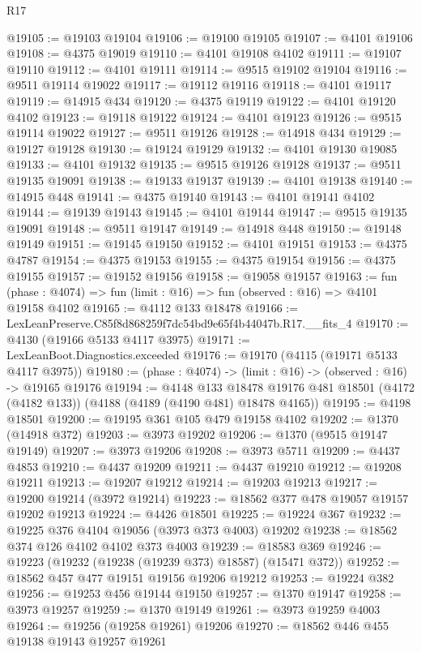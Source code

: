 \begin{lexlean}{R17}
\begin{coremodule}
@19105 := @19103 @19104
@19106 := @19100 @19105
@19107 := @4101 @19106
@19108 := @4375 @19019
@19110 := @4101 @19108 @4102
@19111 := @19107 @19110
@19112 := @4101 @19111
@19114 := @9515 @19102 @19104
@19116 := @9511 @19114 @19022
@19117 := @19112 @19116
@19118 := @4101 @19117
@19119 := @14915 @434
@19120 := @4375 @19119
@19122 := @4101 @19120 @4102
@19123 := @19118 @19122
@19124 := @4101 @19123
@19126 := @9515 @19114 @19022
@19127 := @9511 @19126
@19128 := @14918 @434
@19129 := @19127 @19128
@19130 := @19124 @19129
@19132 := @4101 @19130 @19085
@19133 := @4101 @19132
@19135 := @9515 @19126 @19128
@19137 := @9511 @19135 @19091
@19138 := @19133 @19137
@19139 := @4101 @19138
@19140 := @14915 @448
@19141 := @4375 @19140
@19143 := @4101 @19141 @4102
@19144 := @19139 @19143
@19145 := @4101 @19144
@19147 := @9515 @19135 @19091
@19148 := @9511 @19147
@19149 := @14918 @448
@19150 := @19148 @19149
@19151 := @19145 @19150
@19152 := @4101 @19151
@19153 := @4375 @4787
@19154 := @4375 @19153
@19155 := @4375 @19154
@19156 := @4375 @19155
@19157 := @19152 @19156
@19158 := @19058 @19157
@19163 := fun (phase : @4074) => fun (limit : @16) => fun (observed : @16) => @4101 @19158 @4102
@19165 := @4112 @133 @18478
@19166 := LexLeanPreserve.C85f8d868259f7dc54bd9e65f4b44047b.R17.__fits_4
@19170 := @4130 (@19166 @5133 @4117 @3975)
@19171 := LexLeanBoot.Diagnostics.exceeded
@19176 := @19170 (@4115 (@19171 @5133 @4117 @3975))
@19180 := (phase : @4074) -> (limit : @16) -> (observed : @16) -> @19165 @19176
@19194 := @4148
    @133
    @18478
    @19176
    @481
    @18501
    (@4172 (@4182 @133))
    (@4188 (@4189 (@4190 @481) @18478 @4165))
@19195 := @4198 @18501
@19200 := @19195 @361 @105 @479 @19158 @4102
@19202 := @1370 (@14918 @372)
@19203 := @3973 @19202
@19206 := @1370 (@9515 @19147 @19149)
@19207 := @3973 @19206
@19208 := @3973 @5711
@19209 := @4437 @4853
@19210 := @4437 @19209
@19211 := @4437 @19210
@19212 := @19208 @19211
@19213 := @19207 @19212
@19214 := @19203 @19213
@19217 := @19200 @19214 (@3972 @19214)
@19223 := @18562 @377 @478 @19057 @19157 @19202 @19213
@19224 := @4426 @18501
@19225 := @19224 @367
@19232 := @19225 @376 @4104 @19056 (@3973 @373 @4003) @19202
@19238 := @18562 @374 @126 @4102 @4102 @373 @4003
@19239 := @18583 @369
@19246 := @19223 (@19232 (@19238 (@19239 @373) @18587) (@15471 @372))
@19252 := @18562 @457 @477 @19151 @19156 @19206 @19212
@19253 := @19224 @382
@19256 := @19253 @456 @19144 @19150
@19257 := @1370 @19147
@19258 := @3973 @19257
@19259 := @1370 @19149
@19261 := @3973 @19259 @4003
@19264 := @19256 (@19258 @19261) @19206
@19270 := @18562 @446 @455 @19138 @19143 @19257 @19261

\end{coremodule}
\end{lexlean}
